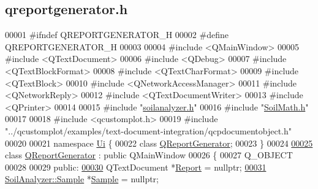 \hypertarget{qreportgenerator_8h_source}{}\subsection{qreportgenerator.\+h}
\label{qreportgenerator_8h_source}

\begin{DoxyCode}
00001 \textcolor{preprocessor}{#ifndef QREPORTGENERATOR\_H}
00002 \textcolor{preprocessor}{#define QREPORTGENERATOR\_H}
00003 
00004 \textcolor{preprocessor}{#include <QMainWindow>}
00005 \textcolor{preprocessor}{#include <QTextDocument>}
00006 \textcolor{preprocessor}{#include <QDebug>}
00007 \textcolor{preprocessor}{#include <QTextBlockFormat>}
00008 \textcolor{preprocessor}{#include <QTextCharFormat>}
00009 \textcolor{preprocessor}{#include <QTextBlock>}
00010 \textcolor{preprocessor}{#include <QNetworkAccessManager>}
00011 \textcolor{preprocessor}{#include <QNetworkReply>}
00012 \textcolor{preprocessor}{#include <QTextDocumentWriter>}
00013 \textcolor{preprocessor}{#include <QPrinter>}
00014 
00015 \textcolor{preprocessor}{#include "\hyperlink{soilanalyzer_8h}{soilanalyzer.h}"}
00016 \textcolor{preprocessor}{#include "\hyperlink{_soil_math_8h}{SoilMath.h}"}
00017 
00018 \textcolor{preprocessor}{#include <qcustomplot.h>}
00019 \textcolor{preprocessor}{#include "../qcustomplot/examples/text-document-integration/qcpdocumentobject.h"}
00020 
00021 \textcolor{keyword}{namespace }\hyperlink{namespace_ui}{Ui} \{
00022   \textcolor{keyword}{class }\hyperlink{class_q_report_generator}{QReportGenerator};
00023 \}
00024 
\hypertarget{qreportgenerator_8h_source_l00025}{}\hyperlink{class_q_report_generator}{00025} \textcolor{keyword}{class }\hyperlink{class_q_report_generator}{QReportGenerator} : \textcolor{keyword}{public} QMainWindow
00026 \{
00027   Q\_OBJECT
00028 
00029 \textcolor{keyword}{public}:
\hypertarget{qreportgenerator_8h_source_l00030}{}\hyperlink{class_q_report_generator_ab051048608bc51151bc0b1ffc217f292}{00030}   QTextDocument *\hyperlink{class_q_report_generator_ab051048608bc51151bc0b1ffc217f292}{Report} = \textcolor{keyword}{nullptr};
\hypertarget{qreportgenerator_8h_source_l00031}{}\hyperlink{class_q_report_generator_a779d8c539bb762daccaf61189cedcae5}{00031}   \hyperlink{class_soil_analyzer_1_1_sample}{SoilAnalyzer::Sample} *\hyperlink{class_q_report_generator_a779d8c539bb762daccaf61189cedcae5}{Sample} = \textcolor{keyword}{nullptr};

\end{DoxyCode}
